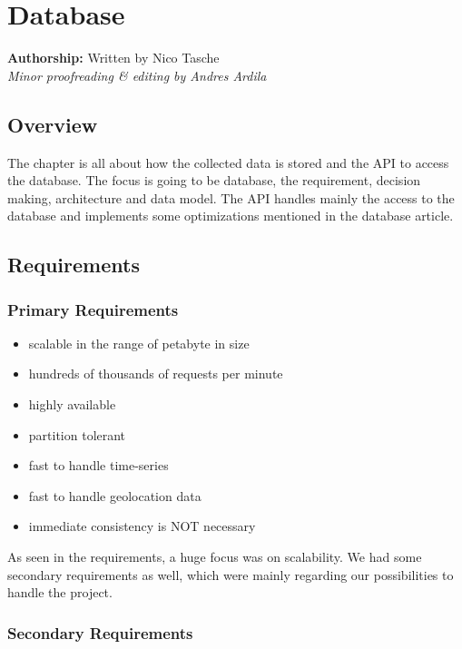\section{Database}\label{sec:database}

\textbf{Authorship:} Written by Nico Tasche\\
\emph{Minor proofreading \& editing by Andres Ardila}
\vspace{10 pt}

\subsection{Overview}\label{overview}

The chapter is all about how the collected data is stored and the API to
access the database. The focus is going to be database, the requirement,
decision making, architecture and data model. The API handles mainly the
access to the database and implements some optimizations mentioned in
the database article.

\subsection{Requirements}\label{requirements}

\subsubsection{Primary Requirements}\label{primary-requirements}

\begin{itemize}
\tightlist
\item
  scalable in the range of petabyte in size
\item
  hundreds of thousands of requests per minute
\item
  highly available
\item
  partition tolerant
\item
  fast to handle time-series
\item
  fast to handle geolocation data
\item
  immediate consistency is NOT necessary
\end{itemize}

As seen in the requirements, a huge focus was on scalability. We had
some secondary requirements as well, which were mainly regarding our
possibilities to handle the project.

\subsubsection{Secondary Requirements}\label{secondary-requirements}

